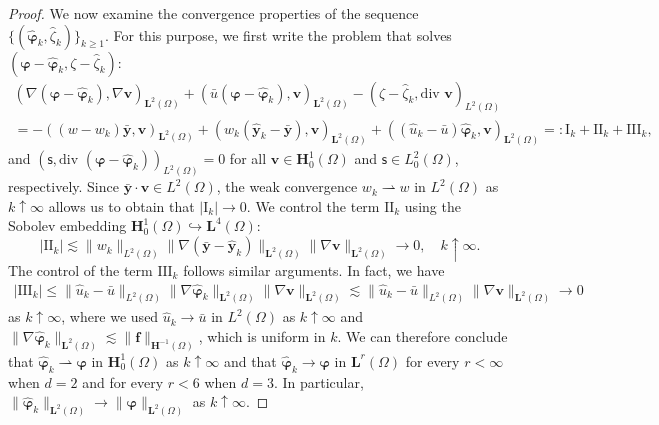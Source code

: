 \documentclass[final]{siamart0216}
\begin{document}
\begin{proof}
We now examine the convergence properties of the sequence $\{ ( \hat{\boldsymbol{\varphi}}_k,\hat{\zeta}_k) \}_{k \geq 1}$. For this purpose, we first write the problem that solves $(\boldsymbol{\varphi}-\hat{\boldsymbol{\varphi}}_k, \zeta-\hat{\zeta}_k)$:
\begin{multline*}
(\nabla (\boldsymbol{\varphi}-\hat{\boldsymbol{\varphi}}_k),\nabla \mathbf{v})_{\mathbf{L}^2(\Omega)}+( \bar{u}(\boldsymbol{\varphi}-\hat{\boldsymbol{\varphi}}_k), \mathbf{v})_{\mathbf{L}^2(\Omega)}-(\zeta-\hat{\zeta}_k,\text{div }\mathbf{v})_{L^2(\Omega)} \\=- ((w-w_k)\bar{\mathbf{y}},\mathbf{v})_{\mathbf{L}^2(\Omega)}+(w_k(\hat{\mathbf{y}}_k-\bar{\mathbf{y}}),\mathbf{v})_{\mathbf{L}^2(\Omega)}+((\hat{u}_k-\bar{u})\hat{\boldsymbol{\varphi}}_k,\mathbf{v})_{\mathbf{L}^2(\Omega)}
=:\text{I}_k+\text{II}_k+\text{III}_k,
\end{multline*}
and $(\mathsf{s},\text{div }(\boldsymbol{\varphi} - \hat{\boldsymbol{\varphi}}_k))_{L^2(\Omega)}  =  0$ for all $\mathbf{v}\in \mathbf{H}_0^1(\Omega)$ and $\mathsf{s}\in L_0^2(\Omega)$, respectively. Since $\bar{\mathbf{y}}\cdot\mathbf{v}\in L^{2}(\Omega)$, the weak convergence $w_k \rightharpoonup w$ in $L^2(\Omega)$ as $k \uparrow\infty$ allows us to obtain that $|\text{I}_k|\to 0$. We control the term $\text{II}_k$ using the Sobolev embedding $\mathbf{H}_0^1(\Omega) \hookrightarrow \mathbf{L}^{4}(\Omega)$:
\begin{equation*}
|\text{II}_k|
\lesssim
\|w_k\|_{L^2(\Omega)}\|\nabla(\bar{\mathbf{y}}-\hat{\mathbf{y}}_k)\|_{\mathbf{L}^{2}(\Omega)}\|\nabla\mathbf{v}\|_{\mathbf{L}^{2}(\Omega)}
\to 0,
\quad k\uparrow\infty.
\end{equation*}
The control of the term $\text{III}_k$ follows similar arguments. In fact, we have
\begin{align*}
|\text{III}_k|\leq
\| \hat{u}_k-\bar{u}\|_{L^{2}(\Omega)}
\|\nabla\hat{\boldsymbol{\varphi}}_k\|_{\mathbf{L}^{2}(\Omega)} \|\nabla\mathbf{v}\|_{\mathbf{L}^{2}(\Omega)}
\lesssim
\| \hat{u}_k-\bar{u}\|_{L^{2}(\Omega)} \|\nabla\mathbf{v}\|_{\mathbf{L}^{2}(\Omega)} \rightarrow 0
\end{align*}
as $k \uparrow \infty$, where we used $\hat{u}_k\to\bar{u}$ in $L^2(\Omega)$ as $k\uparrow\infty$ and $\|\nabla\hat{\boldsymbol{\varphi}}_k\|_{\mathbf{L}^2(\Omega)}\lesssim\|\mathbf{f}\|_{\mathbf{H}^{-1}(\Omega)}$, which is uniform in $k$. We can therefore conclude that $\hat{\boldsymbol{\varphi}}_k\rightharpoonup\boldsymbol{\varphi}$ in $\mathbf{H}_0^1(\Omega)$ as $k \uparrow \infty$ and that $\hat{\boldsymbol{\varphi}}_k \rightarrow \boldsymbol{\varphi}$ in $\mathbf{L}^r(\Omega)$ for every $r < \infty$ when $d = 2$ and for every $r < 6$ when $d = 3$. In particular, $\|\hat{\boldsymbol{\varphi}}_k\|_{\mathbf{L}^2(\Omega)} \to \|\boldsymbol{\varphi}\|_{\mathbf{L}^2(\Omega)}$ as $k\uparrow\infty$.


\end{proof}
\end{document}
